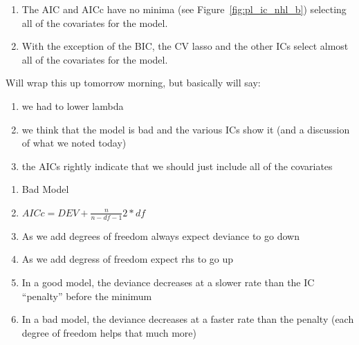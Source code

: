 \documentclass[11pt, fleqn]{article}
\begin{document}
\begin{enumerate}
  \item The AIC and AICc have no minima (see Figure~\vref{fig:pl_ic_nhl_b}) selecting all of the covariates for the model.
  \item With the exception of the BIC, the CV lasso and the other ICs select almost all of the covariates for the model.
\end{enumerate}

Will wrap this up tomorrow morning, but basically will say:
\begin{enumerate}
  \item we had to lower lambda
  \item we think that the model is bad and the various ICs show it (and a discussion of what we noted today)
  \item the AICs rightly indicate that we should just include all of the covariates
\end{enumerate}

\begin{enumerate}
  \item Bad Model
  \item $AICc = DEV + \frac{n}{n-df-1}2*df$
  \item As we add degrees of freedom always expect deviance to go down
  \item As we add degress of freedom expect rhs to go up
  \item In a good model, the deviance decreases at a slower rate than the IC ``penalty'' before the minimum
  \item In a bad model, the deviance decreases at a faster rate than the penalty (each degree of freedom helps that much more)
\end{enumerate}
\end{document}
